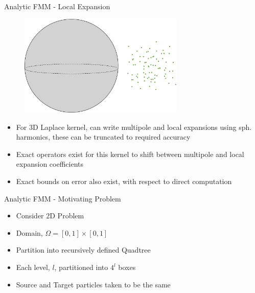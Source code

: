 \begin{frame}{Analytic FMM - Local Expansion}
    \begin{figure}
        \includegraphics[width=0.7\textwidth]{assets/local.png}
    \end{figure}
\end{frame}

\begin{frame}
    \begin{itemize}
        \item For 3D Laplace kernel, can write multipole and local expansions using sph. harmonics, these can be truncated to required accuracy
        \item Exact operators exist for this kernel to shift between multipole and local expansion coefficients
        \item Exact bounds on error also exist, with respect to direct computation \cite{Greengard:1987:JCP}
    \end{itemize}
\end{frame}

\begin{frame}{Analytic FMM - Motivating Problem}
    \begin{itemize}
        \item Consider 2D Problem
        \item Domain, $\Omega = [0,1] \times [0, 1]$
        \item Partition into recursively defined Quadtree
        \item Each level, $l$, partitioned into $4^l$ boxes
        \item Source and Target particles taken to be the same
    \end{itemize}
\end{frame}

